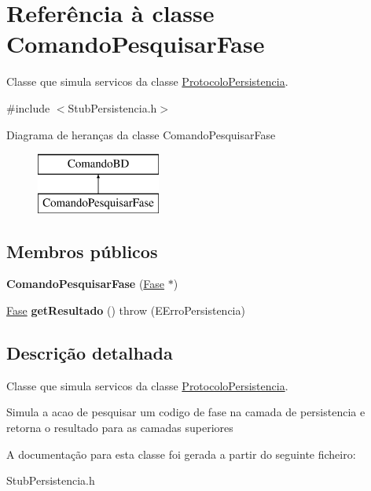 \hypertarget{class_comando_pesquisar_fase}{
\section{\-Referência à classe \-Comando\-Pesquisar\-Fase}
\label{class_comando_pesquisar_fase}
}


\-Classe que simula servicos da classe \hyperlink{class_protocolo_persistencia}{\-Protocolo\-Persistencia}.  




{\ttfamily \#include $<$\-Stub\-Persistencia.\-h$>$}

\-Diagrama de heranças da classe \-Comando\-Pesquisar\-Fase\begin{figure}[H]
\begin{center}
\leavevmode
\includegraphics[height=2.000000cm]{class_comando_pesquisar_fase}
\end{center}
\end{figure}
\subsection*{\-Membros públicos}
\begin{DoxyCompactItemize}
\item 
\hypertarget{class_comando_pesquisar_fase_ac3847c8c1d5a1d00272ef23242129df5}{
{\bfseries \-Comando\-Pesquisar\-Fase} (\hyperlink{class_fase}{\-Fase} $\ast$)}
\label{class_comando_pesquisar_fase_ac3847c8c1d5a1d00272ef23242129df5}

\item 
\hypertarget{class_comando_pesquisar_fase_a8913d3a0b970cd31fc7e8ed2cf5e3391}{
\hyperlink{class_fase}{\-Fase} {\bfseries get\-Resultado} ()  throw (\-E\-Erro\-Persistencia)}
\label{class_comando_pesquisar_fase_a8913d3a0b970cd31fc7e8ed2cf5e3391}

\end{DoxyCompactItemize}


\subsection{\-Descrição detalhada}
\-Classe que simula servicos da classe \hyperlink{class_protocolo_persistencia}{\-Protocolo\-Persistencia}. 

\-Simula a acao de pesquisar um codigo de fase na camada de persistencia e retorna o resultado para as camadas superiores 

\-A documentação para esta classe foi gerada a partir do seguinte ficheiro\-:\begin{DoxyCompactItemize}
\item 
\-Stub\-Persistencia.\-h\end{DoxyCompactItemize}

